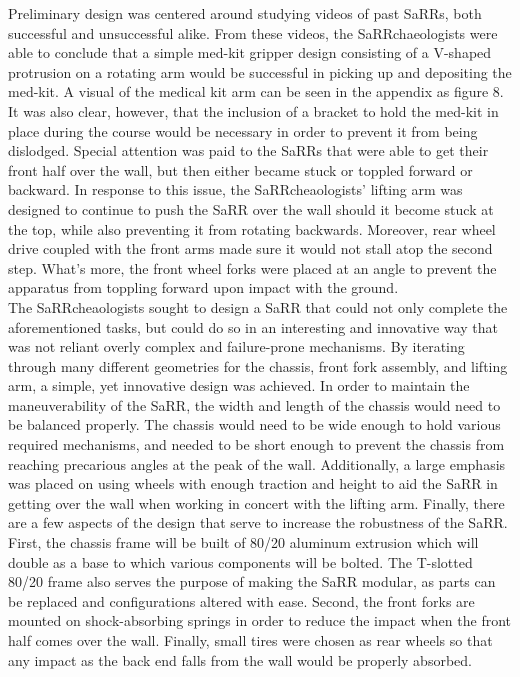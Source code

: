 \documentclass[12pt]{article}
\begin{document}
Preliminary design was centered around studying videos of past SaRRs, both successful and unsuccessful alike. From these videos, the SaRRchaeologists were able to conclude that a simple med-kit gripper design consisting of a V-shaped protrusion on a rotating arm would be successful in picking up and depositing the med-kit. A visual of the medical kit arm can be seen in the appendix as figure 8. It was also clear, however, that the inclusion of a bracket to hold the med-kit in place during the course would be necessary in order to prevent it from being dislodged. Special attention was paid to the SaRRs that were able to get their front half over the wall, but then either became stuck or toppled forward or backward. In response to this issue, the SaRRcheaologists' lifting arm was designed to continue to push the SaRR over the wall should it become stuck at the top, while also preventing it from rotating backwards. Moreover, rear wheel drive coupled with the front arms made sure it would not stall atop the second step. What's more, the front wheel forks were placed at an angle to prevent the apparatus from toppling forward upon impact with the ground. \\

The SaRRcheaologists sought to design a SaRR that could not only complete the aforementioned tasks, but could do so in an interesting and innovative way that was not reliant overly complex and failure-prone mechanisms. By iterating through many different geometries for the chassis, front fork assembly, and lifting arm, a simple, yet innovative design was achieved. In order to maintain the maneuverability of the SaRR, the width and length of the chassis would need to be balanced properly. The chassis would need to be wide enough to hold various required mechanisms, and needed to be short enough to prevent the chassis from reaching precarious angles at the peak of the wall. Additionally, a large emphasis was placed on using wheels with enough traction and height to aid the SaRR in getting over the wall when working in concert with the lifting arm. Finally, there are a few aspects of the design that serve to increase the robustness of the SaRR. First, the chassis frame will be built of 80/20 aluminum extrusion which will double as a base to which various components will be bolted. The T-slotted 80/20 frame also serves the purpose of making the SaRR modular, as parts can be replaced and configurations altered with ease. Second, the front forks are mounted on shock-absorbing springs in order to reduce the impact when the front half comes over the wall. Finally, small tires were chosen as rear wheels so that any impact as the back end falls from the wall would be properly absorbed. \\
\end{document}
